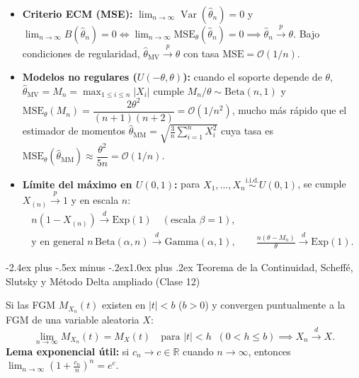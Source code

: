 \documentclass[10pt,a4paper]{article}
\makeatletter
\newcommand{\R}{\mathbb{R}}
\newcommand{\Var}{\operatorname{Var}}
\newcommand{\iid}{\overset{\text{i.i.d.}}{\sim}}
\newcommand{\dto}{\xrightarrow{\;d\;}}
\newcommand{\pto}{\xrightarrow{\;p\;}}
\renewcommand\section{\@startsection{section}{1}{0pt}%
  {-2.4ex plus -.5ex minus -.2ex}{1.0ex plus .2ex}%
  {\normalfont\large\bfseries\color{seccolor}}}
\makeatother
\begin{document}
\begin{notebox}[frametitle={Consistencia del EMV, velocidades de convergencia y máximo en $U(0,1)$}]
\begin{itemize}
  \item \textbf{Criterio ECM (MSE):} $\lim_{n\to\infty} \Var(\hat\theta_n) = 0$ y $\lim_{n\to\infty} B(\hat\theta_n) = 0 \iff \lim_{n\to\infty} \text{MSE}_\theta(\hat\theta_n) = 0 \implies \hat\theta_n \pto \theta$. Bajo condiciones de regularidad, $\hat\theta_{\text{MV}} \pto \theta$ con tasa $\text{MSE} = \mathcal{O}(1/n)$.
  \item \textbf{Modelos no regulares ($U(-\theta, \theta)$):} cuando el soporte depende de $\theta$, $\hat\theta_{\text{MV}} = M_n = \max_{1\le i\le n}|X_i|$ cumple $M_n/\theta \sim \text{Beta}(n,1)$ y $\text{MSE}_\theta(M_n) = \dfrac{2\theta^2}{(n+1)(n+2)} = \mathcal{O}(1/n^2)$, mucho más rápido que el estimador de momentos $\hat\theta_{\text{MM}} = \sqrt{\frac{3}{n}\sum_{i=1}^n X_i^2}$ cuya tasa es $\text{MSE}_\theta(\hat\theta_{\text{MM}}) \approx \dfrac{\theta^2}{5n} = \mathcal{O}(1/n)$.
  \item \textbf{Límite del máximo en $U(0,1)$:} para $X_1,\dots,X_n \iid U(0,1)$, se cumple $X_{(n)} \pto 1$ y en escala $n$:
  \begin{gather*}
  n(1 - X_{(n)}) \dto \text{Exp}(1) \quad (\text{escala }\beta = 1),\\
  \text{y en general } n\,\text{Beta}(\alpha, n) \dto \text{Gamma}(\alpha, 1),\qquad \frac{n(\theta - M_n)}{\theta} \dto \text{Exp}(1).
  \end{gather*}
\end{itemize}
\end{notebox}

\section{Teorema de la Continuidad, Scheffé, Slutsky y Método Delta ampliado \textmd{(Clase 12)}}

\begin{thmbox}[frametitle={Teorema de la Continuidad (FGM / Lévy) y lema exponencial}]
Si las FGM $M_{X_n}(t)$ existen en $|t| < b$ ($b > 0$) y convergen puntualmente a la FGM de una variable aleatoria $X$:
\[
\lim_{n\to\infty} M_{X_n}(t) = M_X(t) \quad \text{para } |t| < h \;\;(0 < h \le b) \implies X_n \dto X.
\]
\textbf{Lema exponencial útil:} si $c_n \to c \in \R$ cuando $n \to \infty$, entonces $\displaystyle\lim_{n\to\infty}\left(1 + \frac{c_n}{n}\right)^n = e^c$.
\end{thmbox}
\end{document}
